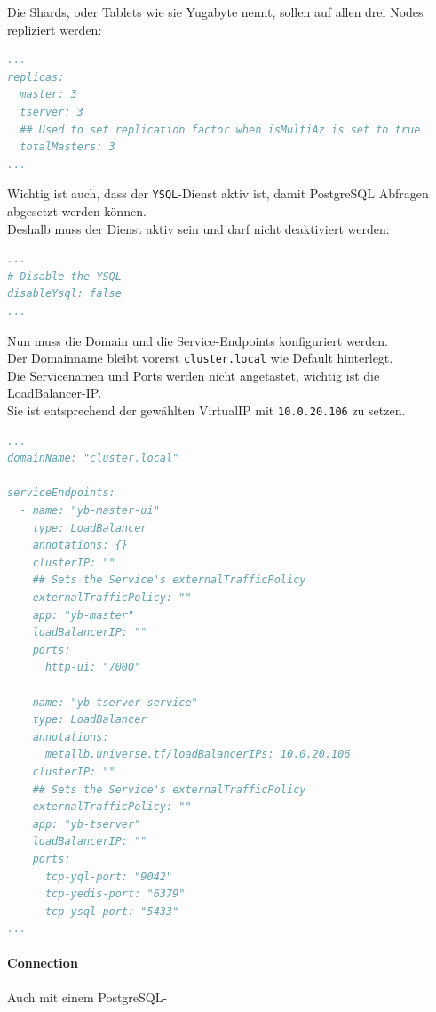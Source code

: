 \begin{flushleft}
    Die Shards, oder Tablets wie sie Yugabyte nennt, sollen auf allen drei Nodes repliziert werden:
    \lstset{style=gra_codestyle}
    \begin{lstlisting}[language=yaml, caption=yugabyteDB - Helm Chart Manifest - Detail Replika,captionpos=b,label={lst:yugabytedb-replica-setting},breaklines=true]
...
replicas:
  master: 3
  tserver: 3
  ## Used to set replication factor when isMultiAz is set to true
  totalMasters: 3
...
    \end{lstlisting}

    Wichtig ist auch, dass der \texttt{YSQL}-Dienst aktiv ist, damit PostgreSQL Abfragen abgesetzt werden können.\\
    Deshalb muss der Dienst aktiv sein und darf nicht deaktiviert werden:
    \lstset{style=gra_codestyle}
    \begin{lstlisting}[language=yaml, caption=yugabyteDB - Helm Chart Manifest - Detail Disable YSQL,captionpos=b,label={lst:yugabytedb-disableYsql-setting},breaklines=true]
...
# Disable the YSQL
disableYsql: false
...
    \end{lstlisting}

    Nun muss die Domain und die Service-Endpoints konfiguriert werden.\\
    Der Domainname bleibt vorerst \texttt{cluster.local} wie Default hinterlegt.\\
    Die Servicenamen und Ports werden nicht angetastet, wichtig ist die LoadBalancer-IP.\\
    Sie ist entsprechend der gewählten VirtualIP mit \texttt{10.0.20.106} zu setzen.

    \lstset{style=gra_codestyle}
    \begin{lstlisting}[language=yaml, caption=yugabyteDB - Helm Chart Manifest - Detail Domainname und Service-Endpoints,captionpos=b,label={lst:yugabytedb-domainname-serviceendpoints-setting},breaklines=true]
...
domainName: "cluster.local"

serviceEndpoints:
  - name: "yb-master-ui"
    type: LoadBalancer
    annotations: {}
    clusterIP: ""
    ## Sets the Service's externalTrafficPolicy
    externalTrafficPolicy: ""
    app: "yb-master"
    loadBalancerIP: ""
    ports:
      http-ui: "7000"

  - name: "yb-tserver-service"
    type: LoadBalancer
    annotations:
      metallb.universe.tf/loadBalancerIPs: 10.0.20.106
    clusterIP: ""
    ## Sets the Service's externalTrafficPolicy
    externalTrafficPolicy: ""
    app: "yb-tserver"
    loadBalancerIP: ""
    ports:
      tcp-yql-port: "9042"
      tcp-yedis-port: "6379"
      tcp-ysql-port: "5433"
...
    \end{lstlisting}

\end{flushleft}
\begin{flushleft}

    \paragraph{Connection}
    Auch mit einem PostgreSQL-
\end{flushleft}